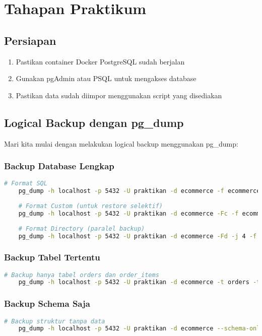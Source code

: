 \section{Tahapan Praktikum}

\subsection{Persiapan}
\begin{enumerate}
	\item Pastikan container Docker PostgreSQL sudah berjalan
	\item Gunakan pgAdmin atau PSQL untuk mengakses database
	\item Pastikan data sudah diimpor menggunakan script yang disediakan
\end{enumerate}

\subsection{Logical Backup dengan pg\_dump}
Mari kita mulai dengan melakukan logical backup menggunakan pg\_dump:

\subsubsection{Backup Database Lengkap}
\begin{lstlisting}[language=bash]
	# Format SQL
	pg_dump -h localhost -p 5432 -U praktikan -d ecommerce -f ecommerce_full.sql
	
	# Format Custom (untuk restore selektif)
	pg_dump -h localhost -p 5432 -U praktikan -d ecommerce -Fc -f ecommerce_full.dump
	
	# Format Directory (paralel backup)
	pg_dump -h localhost -p 5432 -U praktikan -d ecommerce -Fd -j 4 -f ecommerce_backup_dir
\end{lstlisting}

\subsubsection{Backup Tabel Tertentu}
\begin{lstlisting}[language=bash]
	# Backup hanya tabel orders dan order_items
	pg_dump -h localhost -p 5432 -U praktikan -d ecommerce -t orders -t order_items -f orders_backup.sql
\end{lstlisting}

\subsubsection{Backup Schema Saja}
\begin{lstlisting}[language=bash]
	# Backup struktur tanpa data
	pg_dump -h localhost -p 5432 -U praktikan -d ecommerce --schema-only -f ecommerce_schema.sql
\end{lstlisting}

